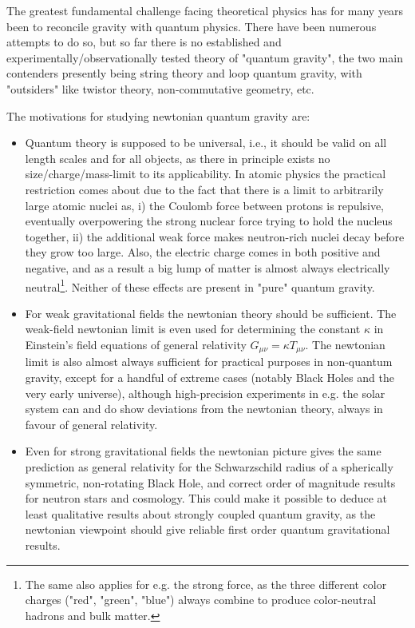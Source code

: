 	The greatest fundamental challenge facing theoretical physics has for many years been to reconcile gravity with quantum physics. There have been numerous attempts to do so, but so far there is no established and experimentally/observationally tested theory of "quantum gravity", the two main contenders presently being string theory and loop quantum gravity, with "outsiders" like twistor theory, non-commutative geometry, etc.
	
	The motivations for studying newtonian quantum gravity are:
	\begin{itemize}
		\item Quantum theory is supposed to be universal, i.e., it should be valid on all length scales and for all objects, as there in principle exists no size/charge/mass-limit to its applicability. In atomic physics the practical restriction comes about due to the	fact that there is a limit to arbitrarily large atomic nuclei as, i) the Coulomb force between protons is repulsive, eventually overpowering the strong nuclear force trying to hold the nucleus together, ii) the additional weak force makes neutron-rich nuclei decay before they grow too large. Also, the electric charge comes in both positive and negative, and as a result a big lump of matter is almost always electrically neutral\footnote{The same also applies for e.g. the strong force, as the three different color charges ("red", "green", "blue") always combine to produce color-neutral hadrons and bulk matter.}. Neither of these effects are present in "pure" quantum gravity.
	
		\item  For weak gravitational fields the newtonian theory should be sufficient. The weak-field newtonian limit is even used for determining the constant $\kappa$ in Einstein's field equations of general relativity $G_{\mu \nu} = \kappa T_{\mu \nu}$. The newtonian limit is also almost always sufficient for practical purposes in non-quantum gravity, except for a handful of extreme cases (notably Black Holes and the very early universe), although high-precision experiments in e.g. the solar system can and do show deviations from the newtonian theory, always in favour of general relativity.
	
		\item  Even for strong gravitational fields the newtonian picture gives the same prediction as general relativity for the Schwarzschild radius of a spherically symmetric, non-rotating Black Hole, and correct order of magnitude results for neutron stars and cosmology. This could make it possible to deduce at least qualitative results about strongly coupled quantum gravity, as the newtonian viewpoint should give reliable first order quantum gravitational results.
	\end{itemize}
	
